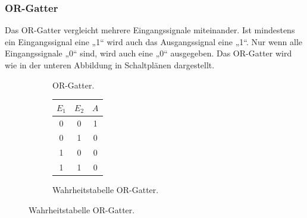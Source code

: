  \subsubsection{OR-Gatter}
    Das OR-Gatter vergleicht mehrere Eingangssignale miteinander.
    Ist mindestens ein Eingangssignal eine „1“ wird auch das Ausgangssignal eine „1“.
    Nur wenn alle Eingangssignale „0“ sind, wird auch eine „0“ ausgegeben.
     Das OR-Gatter wird wie in der unteren Abbildung in Schaltplänen dargestellt.
         \begin{figure}[H]
       \begin{subfigure}[t]{0.48\textwidth}%
        \centering
        \caption{OR-Gatter.\cite{tikz}}
        \vspace{15pt}
      \end{subfigure}
      \hfill
      \begin{subfigure}[t]{0.48\textwidth}
        \centering
        \vspace{0pt}
        \caption{Wahrheitstabelle OR-Gatter.\cite{digbau}}
        \begin{tabular}{c c c}
          \toprule
          $E_1$ & $E_2$ & $A$\\
          \midrule
          0 & 0 & 1\\
          0 & 1  & 0\\
          1 & 0  & 0\\
          1 & 1 & 0 \\
          \bottomrule
        \end{tabular}
      \end{subfigure}
    \end{figure}
